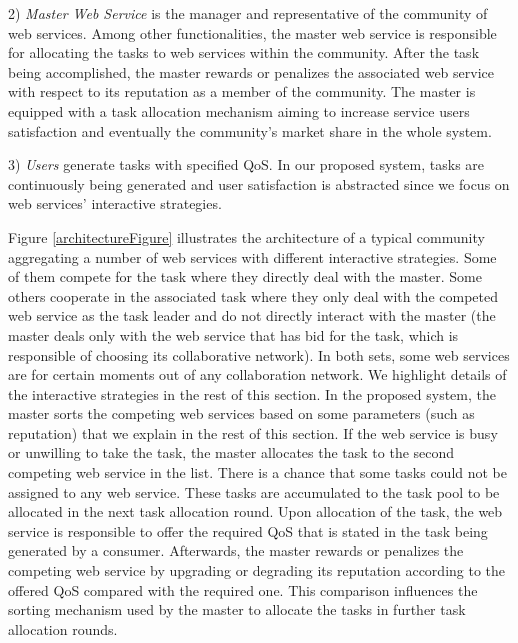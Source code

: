 \documentclass[runningheads,a4paper]{llncs}
\begin{document}
2) \textit{Master Web Service} is the manager and representative
of the community of web services. Among other functionalities, the
master web service is responsible for allocating the tasks to web
services within the community. After the task being accomplished,
the master rewards or penalizes the associated web service with
respect to its reputation as a member of the community. The master
is equipped with a task allocation mechanism aiming to increase
service users satisfaction and eventually the community's market
share in the whole system.

3) \textit{Users} generate tasks with specified QoS. In our
proposed system, tasks are continuously being generated and user
satisfaction is abstracted since we focus on web services'
interactive strategies.

Figure \ref{architectureFigure} illustrates the architecture of a
typical community aggregating a number of web services with
different interactive strategies. Some of them compete for the
task where they directly deal with the master. Some others
cooperate in the associated task where they only deal with the
competed web service as the task leader and do not directly
interact with the master (the master deals only with the web
service that has bid for the task, which is responsible of
choosing its collaborative network). In both sets, some web
services are for certain moments out of any collaboration network.
We highlight details of the interactive strategies in the rest of
this section.
In the proposed system, the master sorts the competing web
services based on some parameters (such as reputation) that we
explain in the rest of this section. If the web service is busy or
unwilling to take the task, the master allocates the task to the
second competing web service in the list. There is a chance that
some tasks could not be assigned to any web service. These tasks
are accumulated to the task pool to be allocated in the next task
allocation round. Upon allocation of the task, the web service is
responsible to offer the required QoS that is stated in the task
being generated by a consumer. Afterwards,  the master rewards or
penalizes the competing web service by upgrading or degrading its
reputation according to the offered QoS compared with the required
one. This comparison influences the sorting mechanism used by the
master to allocate the tasks in further task allocation rounds.
\end{document}
